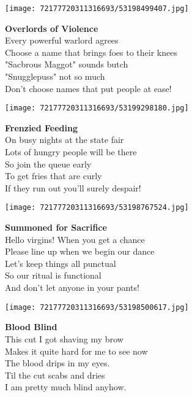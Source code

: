 \documentclass[10pt,letterpaper]{article}
\begin{document}
\begin{center}\texttt{[image: 72177720311316693/53198499407.jpg]}
\end{center}
\begin{center}
\textbf{Overlords of Violence}\\
\vskip 0.2in
Every powerful warlord agrees\\
Choose a name that brings foes to their knees\\
"Sacbrous Maggot" sounds butch\\
"Snugglepuss" not so much\\
Don't choose names that put people at ease!\\
\end{center}
\pagebreak

\begin{center}
\texttt{[image: 72177720311316693/53199298180.jpg]}
\end{center}

\begin{center}
\textbf{Frenzied Feeding}\\
\vskip 0.2in
On busy nights at the state fair\\
Lots of hungry people will be there\\
So join the queue early\\
To get fries that are curly\\
If they run out you'll surely despair!\\
\end{center}
\pagebreak

\begin{center}\texttt{[image: 72177720311316693/53198767524.jpg]}
\end{center}
\begin{center}
\textbf{Summoned for Sacrifice}\\
\vskip 0.2in
Hello virgins!  When you get a chance\\
Please line up when we begin our dance\\
Let's keep things all punctual\\
So our ritual is functional\\
And don't let anyone in your pants!\\
\end{center}
\pagebreak

\begin{center}\texttt{[image: 72177720311316693/53198500617.jpg]}
\end{center}
\begin{center}
\textbf{Blood Blind}\\
\vskip 0.2in
This cut I got shaving my brow\\
Makes it quite hard for me to see now\\
The blood drips in my eyes.\\
Til the cut scabs and dries\\
I am pretty much blind anyhow.\\
\end{center}
\pagebreak
\end{document}
